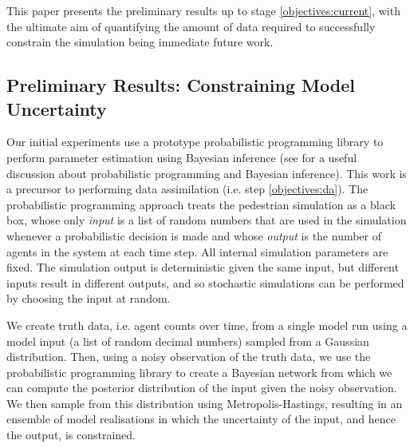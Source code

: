 \documentclass[runningheads]{llncs}
\begin{document}
This paper presents the preliminary results up to stage \ref{objectives:current}, with the ultimate aim of quantifying the amount of data required to successfully constrain the simulation being immediate future work. 


\subsection{Preliminary Results: Constraining Model Uncertainty}

Our initial experiments use a prototype probabilistic programming library to perform parameter estimation using Bayesian inference (see \cite{ghahramani_probabilistic_2015} for a useful discussion about probabilistic programming and Bayesian inference). This work is a precursor to performing data assimilation (i.e. step \ref{objectives:da}). The probabilistic programming approach treats the pedestrian simulation as a black box, whose only \emph{input} is a list of random numbers that are used in the simulation whenever a probabilistic decision is made and whose \emph{output} is the number of agents in the system at each time step. All internal simulation parameters are fixed. The simulation output is deterministic given the same input, but different inputs result in different outputs, and so stochastic simulations can be performed by choosing the input at random.

We create truth data, i.e. agent counts over time, from a single model run using a model input (a list of random decimal numbers) sampled from a Gaussian distribution. Then, using a noisy observation of the truth data, we use the probabilistic programming library to create a Bayesian network from which we can compute the posterior distribution of the input given the noisy observation. We then sample from this distribution using Metropolis-Hastings, resulting in an ensemble of model realisations in which the uncertainty of the input, and hence the output, is constrained.

\end{document}
